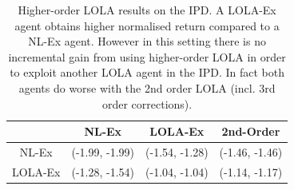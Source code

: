 \begin{table}[h!]
\begin{center}
\begin{tabular}{c|c|c|c}
\hline
 & NL-Ex & LOLA-Ex & 2nd-Order \\
\hline
NL-Ex & (-1.99, -1.99) & (-1.54, -1.28) & (-1.46, -1.46) \\
\hline
LOLA-Ex & (-1.28, -1.54) & (-1.04, -1.04) & (-1.14, -1.17) \\
\hline
\end{tabular}
\end{center}
\caption{Higher-order LOLA results on the IPD. A LOLA-Ex agent obtains higher normalised return compared to a NL-Ex agent. However in this setting there is no incremental gain from using higher-order LOLA in order to exploit another LOLA agent in the IPD. In fact both agents do worse with the 2nd order LOLA (incl. 3rd order corrections).}
\label{tab:higherorder}
\end{table}
 	\vspace{-6ex}




